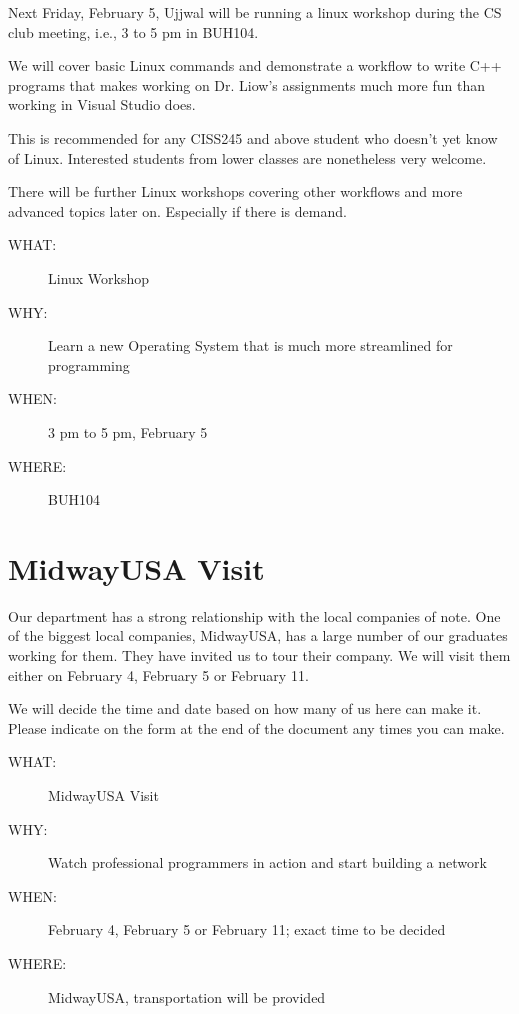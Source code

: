 Next Friday, February 5, Ujjwal will be running a linux workshop during the CS club
meeting, i.e., 3 to 5 pm in BUH104.

We will cover basic Linux commands and demonstrate a workflow to write C++
programs that makes working on Dr. Liow's assignments much more fun than
working in Visual Studio does.

This is recommended for any CISS245 and above student who doesn't yet know of
Linux. Interested students from lower classes are nonetheless very welcome.

There will be further Linux workshops covering other workflows and more advanced
topics later on. Especially if there is demand.

\begin{description}
\item[{WHAT:}] Linux Workshop
\item[{WHY:}] Learn a new Operating System that is much more streamlined for programming
\item[{WHEN:}] 3 pm to 5 pm, February 5
\item[{WHERE:}] BUH104
\end{description}


\newpage


\section{MidwayUSA Visit}
\label{sec-5}

Our department has a strong relationship with the local companies of note. One
of the biggest local companies, MidwayUSA, has a large number of our graduates
working for them. They have invited us to tour their company. We will visit
them either on February 4, February 5 or February 11. 

We will decide the time and date based on how many of us here can make
it. Please indicate on the form at the end of the document any times you can
make.

\begin{description}
\item[{WHAT:}] MidwayUSA Visit
\item[{WHY:}] Watch professional programmers in action and start building a network
\item[{WHEN:}] February 4, February 5 or February 11; exact time to be decided
\item[{WHERE:}] MidwayUSA, transportation will be provided
\end{description}


